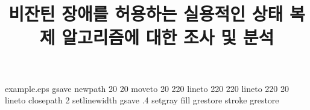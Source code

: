 %
%
%
%
%
\begin{filecontents*}{example.eps}
gsave
newpath
  20 20 moveto
  20 220 lineto
  220 220 lineto
  220 20 lineto
closepath
2 setlinewidth
gsave
  .4 setgray fill
grestore
stroke
grestore
\end{filecontents*}
%
\RequirePackage{fix-cm}
%
\documentclass[smallextended]{svjour3}       %
%
\usepackage{kotex}                           %

\smartqed  %
%
\usepackage{graphicx}
%
%
%
%
%



 
\title{비잔틴 장애를 허용하는 실용적인 상태 복제 알고리즘에 대한 조사 및 분석%
}


